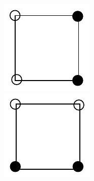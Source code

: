 \documentclass[10pt]{article}
\begin{document}
\includegraphics[max width=\textwidth, center]{2025_09_05_3ba26226ec0baddb5a03g-56(1)}\\
\includegraphics[max width=\textwidth, center]{2025_09_05_3ba26226ec0baddb5a03g-56(8)}\\
\end{document}
